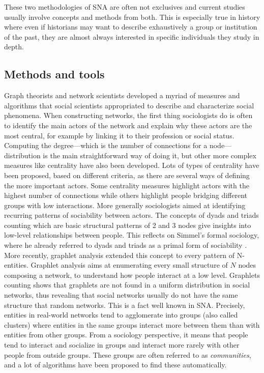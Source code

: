 These two methodologies of SNA are often not exclusives and current studies usually involve concepts and methods from both.
This is especially true in history where even if historians may want to describe exhaustively a group or institution of the past, they are almost always interested in specific individuals they study in depth.

\subsection{Methods and tools}\label{subsec:methods-dans-tools}

Graph theorists and network scientists developed a myriad of measures and algorithms that social scientists appropriated to describe and characterize social phenomena.
When constructing networks, the first thing sociologists do is often to identify the main actors of the network and explain why these actors are the most central, for example by linking it to their profession or social status.
Computing the degree---which is the number of connections for a node---distribution is the main straightforward way of doing it, but other more complex measures like centrality have also been developed.
Lots of types of centrality have been proposed, based on different criteria, as there are several ways of defining the more important actors.
Some centrality measures highlight actors with the highest number of connections while others highlight people bridging different groups with low interactions.
More generally sociologists aimed at identifying recurring patterns of sociability between actors.
The concepts of dyads and triads counting which are basic structural patterns of 2 and 3 nodes give insights into low-level relationships between people.
This reflects on Simmel's formal sociology, where he already referred to dyads and triads as a primal form of sociability \cite{Simmel2013}.
More recently, graphlet analysis extended this concept to every pattern of N-entities.
Graphlet analysis aims at enumerating every small structure of $N$ nodes composing a network, to understand how people interact at a low level.
Graphlets counting shows that graphlets are not found in a uniform distribution in social networks, thus revealing that social networks usually do not have the same structure that random networks.
This is a fact well known in SNA. Precisely, entities in real-world networks tend to agglomerate into groups (also called clusters) where entities in the same groups interact more between them than with entities from other groups.
From a sociology perspective, it means that people tend to interact and socialize in groups and interact more rarely with other people from outside groups.
These groups are often referred to as \emph{communities}, and a lot of algorithms have been proposed to find these automatically.

